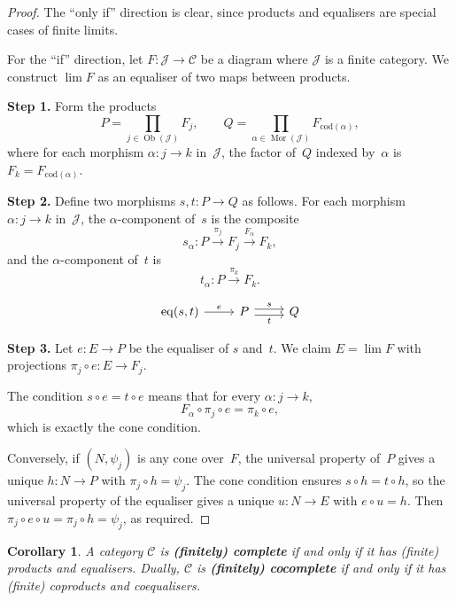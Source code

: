 \documentclass[a4paper,12pt]{book}
\DeclareMathOperator{\Ob}{Ob}
\DeclareMathOperator{\Mor}{Mor}
\DeclareMathOperator{\eq}{eq}
\theoremstyle{definition}
\theoremstyle{plain}
\newtheorem{corollary}[definition]{Corollary}
\theoremstyle{remark}
\begin{document}
\begin{proof}
The ``only if'' direction is clear, since products and equalisers are
special cases of finite limits.

For the ``if'' direction, let $F\colon\mathcal{J}\to\mathcal{C}$
be a diagram where $\mathcal{J}$ is a finite category.
We construct $\lim F$ as an equaliser of two maps between products.

\medskip\noindent
\textbf{Step 1.} Form the products
\[
    P = \prod_{j\in\Ob(\mathcal{J})} F_j,
    \qquad
    Q = \prod_{\alpha\in\Mor(\mathcal{J})} F_{\mathrm{cod}(\alpha)},
\]
where for each morphism $\alpha\colon j\to k$ in~$\mathcal{J}$,
the factor of~$Q$ indexed by~$\alpha$ is $F_k = F_{\mathrm{cod}(\alpha)}$.

\medskip\noindent
\textbf{Step 2.} Define two morphisms $s,t\colon P\to Q$ as follows.
For each morphism $\alpha\colon j\to k$ in~$\mathcal{J}$, the
$\alpha$-component of~$s$ is the composite
\[
    s_\alpha\colon P \xrightarrow{\pi_j} F_j \xrightarrow{F_\alpha} F_k,
\]
and the $\alpha$-component of~$t$ is
\[
    t_\alpha\colon P \xrightarrow{\pi_k} F_k.
\]

\[
\begin{tikzcd}
\eq(s,t) \arrow[r, "e"] & P \arrow[r, shift left, "s"] \arrow[r, shift right, "t"'] & Q
\end{tikzcd}
\]

\medskip\noindent
\textbf{Step 3.} Let $e\colon E\to P$ be the equaliser of $s$ and~$t$.
We claim $E = \lim F$ with projections
$\pi_j\circ e\colon E\to F_j$.

The condition $s\circ e = t\circ e$ means that for every
$\alpha\colon j\to k$,
\[
    F_\alpha \circ \pi_j \circ e = \pi_k \circ e,
\]
which is exactly the cone condition.

Conversely, if $(N,\psi_j)$ is any cone over~$F$, the universal property
of~$P$ gives a unique $h\colon N\to P$ with $\pi_j\circ h = \psi_j$.
The cone condition ensures $s\circ h = t\circ h$, so the universal
property of the equaliser gives a unique $u\colon N\to E$ with
$e\circ u = h$.
Then $\pi_j\circ e\circ u = \pi_j\circ h = \psi_j$, as required.
\end{proof}

\begin{corollary}\label{cor:complete-category}
A category $\mathcal{C}$ is \textbf{(finitely) complete} if and only if
it has (finite) products and equalisers.  Dually, $\mathcal{C}$ is
\textbf{(finitely) cocomplete} if and only if it has (finite) coproducts
and coequalisers.
\end{corollary}
\end{document}
